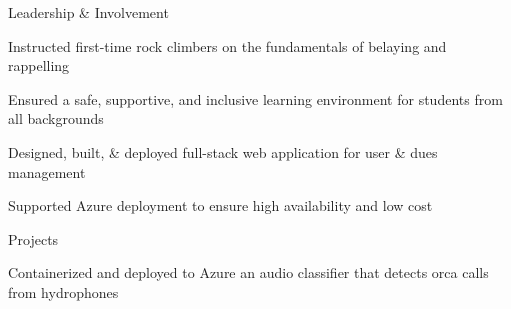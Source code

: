 \documentclass{resume} %
\begin{document}
    \begin{rSection}{Leadership \& Involvement}

        \company{\mountaineers}{\seattle}
                \begin{rList}
		    \item Instructed first-time rock climbers on the fundamentals of belaying and rappelling
		    \item Ensured a safe, supportive, and inclusive learning environment for students from all backgrounds
                \end{rList}
        \vspace{0.5em}

        \company{\wahinekai}{\la}
                \begin{rList}
		    \item Designed, built, \& deployed full-stack web application for user \& dues management
		    \item Supported Azure deployment to ensure high availability and low cost
                \end{rList}
        \vspace{0.5em}

    \end{rSection}


    \begin{rSection}{Projects}

            \begin{rList}
                \item Containerized and deployed to Azure an audio classifier that
                    detects orca calls from hydrophones
            \end{rList}
        \vspace{0.5em}

    \end{rSection}

\end{document}

